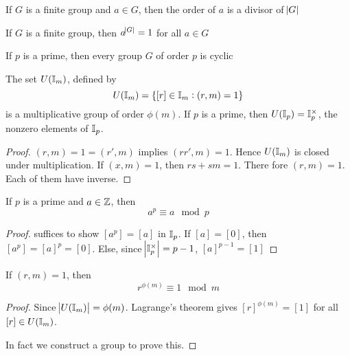 \documentclass[11pt]{article}
\begin{document}
\begin{corollary}[]
If \(G\) is a finite group and \(a\in G\), then the order of \(a\) is a divisor of
\(\abs{G}\) 
\end{corollary}

\begin{corollary}[]
If \(G\) is a finite group, then \(a^{\abs{G}}=1\) for all \(a\in G\)
\end{corollary}

\begin{corollary}[]
If \(p\) is a prime, then every group \(G\) of order \(p\) is cyclic
\end{corollary}

\begin{proposition}[]
The set \(U(\mathbb{I}_m)\), defined by
\begin{equation*}
 U(\mathbb{I}_m)=\{[r]\in\mathbb{I}_m:(r,m)=1\}
\end{equation*}
is a multiplicative group of order \(\phi(m)\). If \(p\) is a prime, then
\(U(\mathbb{I}_p)=\mathbb{I}_p^{\times}\), the nonzero elements of \(\mathbb{I}_p\).
\end{proposition}

\begin{proof}
\((r,m)=1=(r',m)\) implies \((rr',m)=1\). Hence \(U(\mathbb{I}_m)\) is closed under
multiplication. If \((x,m)=1\), then \(rs+sm=1\). There fore \((r,m)=1\). Each of
them have inverse.
\end{proof}

\begin{corollary}[Fermat]
\label{Fermat}
If \(p\) is a prime and \(a\in\mathbb{Z}\), then
\begin{equation*}
a^p\equiv a\mod p
\end{equation*}
\end{corollary}

\begin{proof}
suffices to show \([a^p]=[a]\) in \(\mathbb{I}_p\). If \([a]=[0]\), then \([a^p]=[a]^p=[0]\).
Else, since \(\abs{\mathbb{I}_p^\times}=p-1\), \([a]^{p-1}=[1]\)
\end{proof}


\begin{theorem}[Euler]
If \((r,m)=1\), then
\begin{equation*}
r^{\phi(m)}\equiv 1\mod m
\end{equation*}
\end{theorem}
\begin{proof}
Since \(\abs{U(\mathbb{I}_m)}=\phi(m)\). Lagrange's theorem gives
\([r]^{\phi(m)}=[1]\) for all \([r]\in U(\mathbb{I}_m)\).

In fact we construct a group to prove this.
\end{proof}
\end{document}
